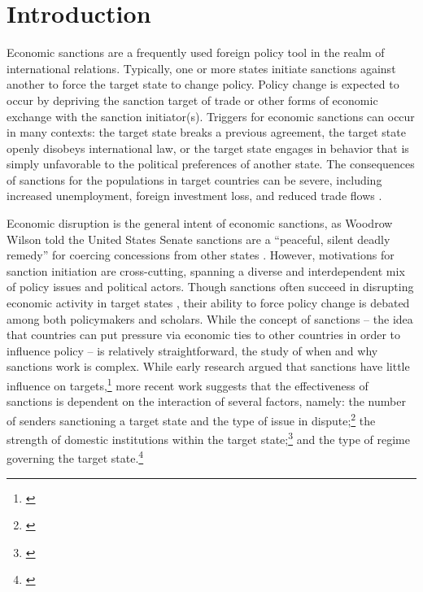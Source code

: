 \section*{Introduction}
\label{intro}

Economic sanctions are a frequently used foreign policy tool in the realm of international relations. Typically, one or more states initiate sanctions against another to force the target state to change policy. Policy change is expected to occur by depriving the sanction target of trade or other forms of economic exchange with the sanction initiator(s). Triggers for economic sanctions can occur in many contexts: the target state breaks a previous agreement, the target state openly disobeys international law, or the target state engages in behavior that is simply unfavorable to the political preferences of another state. The consequences of sanctions for the populations in target countries can be severe, including increased unemployment, foreign investment loss, and reduced trade flows \citep{hufbauer2003impact,hufbauer1997us}. 

Economic disruption is the general intent of economic sanctions, as Woodrow Wilson told the United States Senate sanctions are a ``peaceful, silent deadly remedy'' for coercing concessions from other states \citep{foley23}. However, motivations for sanction initiation are cross-cutting, spanning a diverse and interdependent mix of policy issues and political actors. Though sanctions often succeed in disrupting economic activity in target states \citep{escriba2010dealing}, their ability to force policy change is debated among both policymakers and scholars.  While the concept of sanctions -- the idea that countries can put pressure via economic ties to other countries in order to influence policy -- is relatively straightforward, the study of when and why sanctions work is complex. While early research argued that sanctions have little influence on targets,\footnote{\cite{lam1990, dashti1997, morgan1997, drezner1998}} more recent work suggests that the effectiveness of sanctions is dependent on the interaction of several factors, namely: the number of senders sanctioning a target state and the type of issue in dispute;\footnote{\cite{miers2002, morgan2009threat}} the strength of domestic institutions within the target state;\footnote{\cite{dashti1997,marinov2005}} and the type of regime governing the target state.\footnote{\cite{mcgillivray2004,lektzian2007,allen2008domestic}} 

